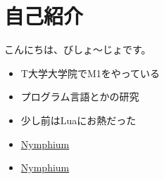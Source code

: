 \section{自己紹介}
\begin{frame}
    \frametitlesec

    \vfill

    \begin{minipage}[b]{.1\textwidth}
        \centering
    \end{minipage}
    \begin{minipage}[b]{.49\textwidth}
        こんにちは、びしょ〜じょです。
    \end{minipage}

    \begin{itemize}
        \item T大学大学院でM1をやっている
        \item プログラム言語とかの研究
        \item 少し前はLuaにお熱だった
    \end{itemize}

    \begin{itemize}
        \item[\textcolor{blue!60!white}{\faicon{twitter}}] \href{https://twitter.com/Nymphium}{Nymphium}
        \item[\textcolor{black}{\faicon{github}}] \href{https://github.com/nymphium}{Nymphium}
    \end{itemize}
    \vfill
\end{frame}

